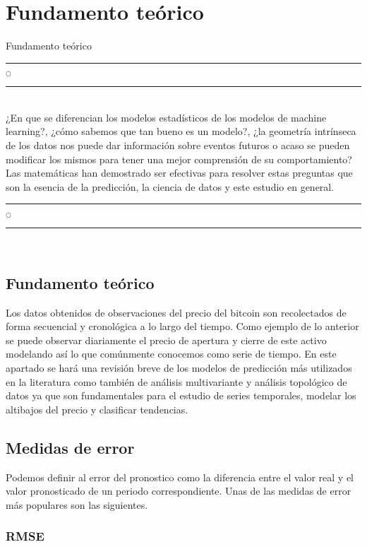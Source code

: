 \chapter[Fundamento teórico]{Fundamento teórico}{Fundamento teórico}\label{Fundamento}

\noindent
\rule{0.49\textwidth}{0.75pt} $_{\bigcirc}$ \rule{0.49\textwidth}{0.75pt}\\

¿En que se diferencian los modelos estadísticos de los modelos de machine learning?, ¿cómo sabemos que tan bueno es un modelo?, ¿la geometría intrínseca de los datos nos puede dar información sobre eventos futuros o acaso se pueden modificar los mismos para tener una mejor comprensión de su comportamiento? Las matemáticas han demostrado ser efectivas para resolver estas preguntas que son la esencia de la predicción, la ciencia de datos y este estudio en general.
\\

\noindent
\rule{0.49\textwidth}{0.75pt} $_{\bigcirc}$ \rule{0.49\textwidth}{0.75pt}\\
\clearpage

\section{Fundamento teórico}

Los datos obtenidos de observaciones del precio del bitcoin son recolectados de forma secuencial y cronológica a lo largo del tiempo. Como ejemplo de lo anterior se puede observar diariamente el precio de apertura y cierre de este activo modelando así lo que comúnmente conocemos como serie de tiempo. En este apartado se hará una revisión breve de los modelos de predicción más utilizados en la literatura como también de análisis multivariante y análisis topológico de datos ya que son fundamentales para el estudio de series temporales, modelar los altibajos del precio y clasificar tendencias.

\section{Medidas de error}
Podemos definir al error del pronostico como la diferencia entre el valor real y el valor pronosticado de un periodo correspondiente. Unas de las medidas de error más populares son las siguientes.

\subsection{RMSE}


